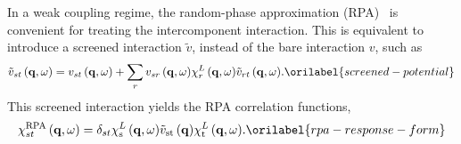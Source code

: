 \documentclass[aps,showkeys,noshowpacs,superscriptaddress,pre,preprint]{revtex4-2}
\let\label\orilabel
\begin{document}
In a weak coupling regime,
the random-phase approximation (RPA)~\cite{Selchow2001,RPA} is convenient for treating the intercomponent interaction.
This is equivalent to introduce a screened interaction $\tilde{v}$, instead of the bare interaction $v$, such as
\begin{equation}
{\tilde{v}_{st} \left( \mathbf{q}, \omega \right) }
= {v_{st} \left( \mathbf{q}, \omega \right) }
+\sum_{r} {v_{sr} \left( \mathbf{q}, \omega \right) }
{\chi^L_r \left( \mathbf{q}, \omega \right)} {\tilde{v}_{rt} \left( \mathbf{q}, \omega \right) } .
\label{screened-potential}
\end{equation}
This screened interaction yields the RPA correlation functions,
\begin{equation}
{\chi^\mathrm{RPA}_{st} \left( \mathbf{q}, \omega \right)} 
= \delta_{st}  
{\chi^L_\mathrm{s} \left( \mathbf{q}, \omega \right)} 
{\tilde{v}_\mathrm{st} \left( \mathbf{q} \right)}
{\chi^L_\mathrm{t} \left( \mathbf{q}, \omega \right)} .
\label{rpa-response-form}
\end{equation}
\end{document}
